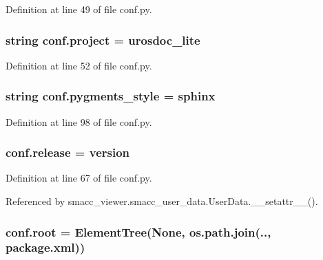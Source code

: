 Definition at line 49 of file conf.\+py.

\subsubsection[{\texorpdfstring{project}{project}}]{\setlength{\rightskip}{0pt plus 5cm}string conf.\+project = u\textquotesingle{}rosdoc\+\_\+lite\textquotesingle{}}\hypertarget{namespaceconf_a45653c983098153b78e33600e39230eb}{}\label{namespaceconf_a45653c983098153b78e33600e39230eb}


Definition at line 52 of file conf.\+py.

\subsubsection[{\texorpdfstring{pygments\+\_\+style}{pygments_style}}]{\setlength{\rightskip}{0pt plus 5cm}string conf.\+pygments\+\_\+style = \textquotesingle{}sphinx\textquotesingle{}}\hypertarget{namespaceconf_a641130e096b26cba8a5d63ed38684de7}{}\label{namespaceconf_a641130e096b26cba8a5d63ed38684de7}


Definition at line 98 of file conf.\+py.

\subsubsection[{\texorpdfstring{release}{release}}]{\setlength{\rightskip}{0pt plus 5cm}conf.\+release = {\bf version}}\hypertarget{namespaceconf_aee93453546a31f4e76999ebaadf6e356}{}\label{namespaceconf_aee93453546a31f4e76999ebaadf6e356}


Definition at line 67 of file conf.\+py.



Referenced by smacc\+\_\+viewer.\+smacc\+\_\+user\+\_\+data.\+User\+Data.\+\_\+\+\_\+setattr\+\_\+\+\_\+().

\subsubsection[{\texorpdfstring{root}{root}}]{\setlength{\rightskip}{0pt plus 5cm}conf.\+root = Element\+Tree(None, os.\+path.\+join(\textquotesingle{}..\textquotesingle{}, \textquotesingle{}package.\+xml\textquotesingle{}))}\hypertarget{namespaceconf_ad32f00e5793a88cf41ae2357bd582ca0}{}\label{namespaceconf_ad32f00e5793a88cf41ae2357bd582ca0}


